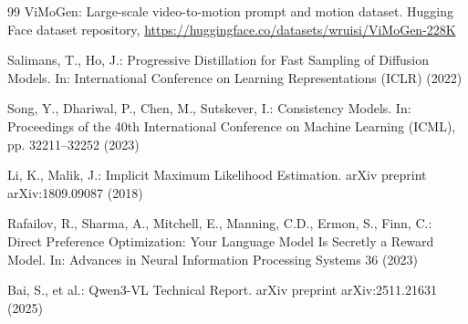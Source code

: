 \documentclass[runningheads]{llncs}
\begin{document}
\begin{thebibliography}{99}
ViMoGen: Large-scale video-to-motion prompt and motion dataset. Hugging Face
dataset repository, \url{https://huggingface.co/datasets/wruisi/ViMoGen-228K}

Salimans, T., Ho, J.: Progressive Distillation for Fast Sampling of Diffusion
Models. In: International Conference on Learning Representations (ICLR) (2022)

Song, Y., Dhariwal, P., Chen, M., Sutskever, I.: Consistency Models. In:
Proceedings of the 40th International Conference on Machine Learning (ICML),
pp. 32211--32252 (2023)

Li, K., Malik, J.: Implicit Maximum Likelihood Estimation. arXiv preprint
arXiv:1809.09087 (2018)

Rafailov, R., Sharma, A., Mitchell, E., Manning, C.D., Ermon, S., Finn, C.:
Direct Preference Optimization: Your Language Model Is Secretly a Reward
Model. In: Advances in Neural Information Processing Systems 36 (2023)

Bai, S., et al.: Qwen3-VL Technical Report. arXiv preprint arXiv:2511.21631
(2025)

\end{thebibliography}
\end{document}
